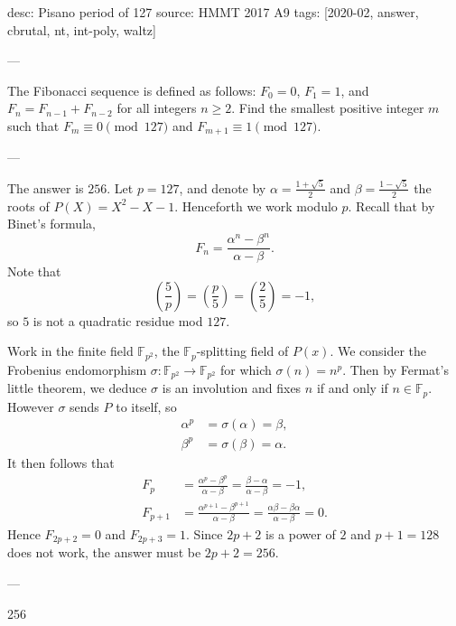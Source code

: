 desc: Pisano period of 127
source: HMMT 2017 A9
tags: [2020-02, answer, cbrutal, nt, int-poly, waltz]

---

The Fibonacci sequence is defined as follows: $F_0=0$, $F_1=1$, and $F_n=F_{n-1}+F_{n-2}$ for all integers $n\ge2$. Find the smallest positive integer $m$ such that $F_m\equiv0\pmod{127}$ and $F_{m+1}\equiv1\pmod{127}$.

---

The answer is $256$. Let $p=127$,  and denote by $\alpha=\tfrac{1+\sqrt5}2$ and $\beta=\tfrac{1-\sqrt5}2$ the roots of $P(X)=X^2-X-1$. Henceforth we work modulo $p$. Recall that by Binet's formula, \[F_n=\frac{\alpha^n-\beta^n}{\alpha-\beta}.\]
Note that \[\left(\frac5p\right)=\left(\frac p5\right)=\left(\frac25\right)=-1,\]
so $5$ is not a quadratic residue mod $127$.

Work in the finite field $\mathbb F_{p^2}$, the $\mathbb F_p$-splitting field of $P(x)$. We consider the Frobenius endomorphism $\sigma:\mathbb F_{p^2}\to\mathbb F_{p^2}$ for which $\sigma(n)=n^p$. Then by Fermat's little theorem, we deduce $\sigma$ is an involution and fixes $n$ if and only if $n\in\mathbb F_p$. However $\sigma$ sends $P$ to itself, so
\begin{align*}
    \alpha^p&=\sigma(\alpha)=\beta,\\
    \beta^p&=\sigma(\beta)=\alpha.
\end{align*}
It then follows that 
\begin{align*}
    F_p&=\frac{\alpha^p-\beta^p}{\alpha-\beta}=\frac{\beta-\alpha}{\alpha-\beta}=-1,\\
    F_{p+1}&=\frac{\alpha^{p+1}-\beta^{p+1}}{\alpha-\beta}=\frac{\alpha\beta-\beta\alpha}{\alpha-\beta}=0.
\end{align*}
Hence $F_{2p+2}=0$ and $F_{2p+3}=1$. Since $2p+2$ is a power of $2$ and $p+1=128$ does not work, the answer must be $2p+2=256$.

---

256
